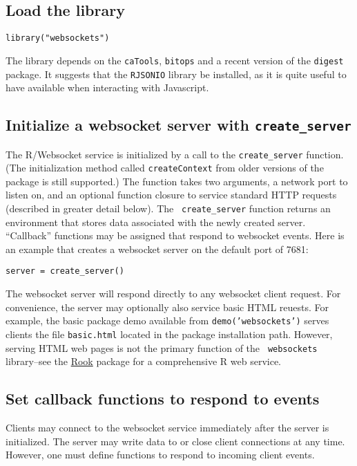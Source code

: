 \documentclass[12pt]{article}
\begin{document}
\subsection{Load the library}
\begin{lstlisting}
library("websockets")
\end{lstlisting}
The library depends on the {\tt caTools}, {\tt bitops} and a recent version of
the {\tt digest} package.  It suggests that the {\tt RJSONIO} library be
installed, as it is quite useful to have available when interacting with
Javascript.

\subsection{Initialize a websocket server with {\tt create\_server}}

The R/Websocket service is initialized by a call to the {\tt create\_server}
function. (The initialization method called {\tt createContext} from older
versions of the package is still supported.) The function takes two arguments,
a network port to listen on, and an optional function closure to service
standard HTTP requests (described in greater detail below).  The {\tt
create\_server} function returns an environment that stores data associated
with the newly created server.  ``Callback'' functions may be assigned that
respond to websocket events. Here is an example that creates a websocket server
on the default port of 7681:
\begin{lstlisting}
server = create_server()
\end{lstlisting}

The websocket server will respond directly to any websocket client request.
For convenience, the server may optionally also service basic HTML reuests.  For
example, the basic package demo available from {\tt demo('websockets')} serves
clients the file {\tt basic.html} located in the package installation path.
However, serving HTML web pages is not the primary function of the {\tt
websockets} library--see the
\href{http://cran.r-project.org/web/packages/Rook/}{Rook} package for a
comprehensive R web service.

\subsection{Set callback functions to respond to events}
Clients may connect to the websocket service immediately after the server is
initialized. The server may write data to or close client connections at any
time.  However, one must define functions to respond to incoming client events.
\end{document}
